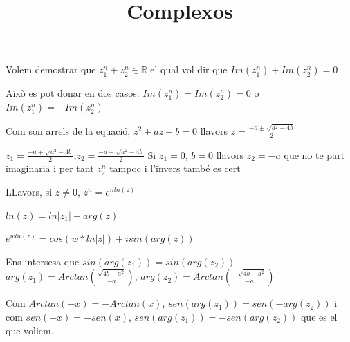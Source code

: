 \documentclass{article}
\title{Complexos}
\begin{document}
\maketitle

Volem demostrar que $z_1^n+z_2^n\in \mathbb{R}$ el qual vol dir que $Im(z_1^n)+Im(z_2^n)=0$

Això es pot donar en dos casos: $Im(z_1^n)=Im(z_2^n)=0$  o  $Im(z_1^n)=-Im(z_2^n)$

Com son arrels de la equació, $z^2+az+b=0$ llavors $z=\frac{-a\pm \sqrt{a^2-4b}}{2}$

$z_1=\frac{-a+\sqrt{a^2-4b}}{2}$,$z_2=\frac{-a-\sqrt{a^2-4b}}{2}$
Si $z_1=0$, $b=0$ llavors $z_2=-a$ que no te part imaginaria i per tant $z_2^n$ tampoc i l'invers també es cert

LLavors, si $z\ne0$, $z^n=e^{nln(z)}$

$ln(z)=ln|z_1|+arg(z)$

$e^{wln(z)}=cos(w*ln|z|)+isin(arg(z))$

Ens intersesa que $sin(arg(z_1))=sin(arg(z_2))$
$arg(z_1)=Arctan(\frac{\sqrt{4b-a^2}}{-a})$, $arg(z_2)=Arctan(\frac{-\sqrt{4b-a^2}}{-a})$

Com $Arctan(-x)=-Arctan(x)$, $sen(arg(z_1))=sen(-arg(z_2))$ i com $sen(-x)=-sen(x)$, $sen(arg(z_1))=-sen(arg(z_2))$ que es el que voliem.
\end{document}
